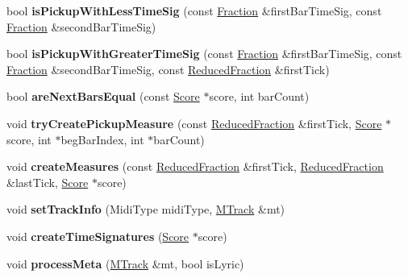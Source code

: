 \begin{DoxyCompactItemize}
\mbox{\label{namespace_ms_a4cdc7d39f903f2e1b78e5e2279b4a17a}} 
bool {\bfseries is\+Pickup\+With\+Less\+Time\+Sig} (const \hyperlink{class_ms_1_1_fraction}{Fraction} \&first\+Bar\+Time\+Sig, const \hyperlink{class_ms_1_1_fraction}{Fraction} \&second\+Bar\+Time\+Sig)
\item 
\mbox{\label{namespace_ms_ae5170436b6e52f3aafe94ecda1273c24}} 
bool {\bfseries is\+Pickup\+With\+Greater\+Time\+Sig} (const \hyperlink{class_ms_1_1_fraction}{Fraction} \&first\+Bar\+Time\+Sig, const \hyperlink{class_ms_1_1_fraction}{Fraction} \&second\+Bar\+Time\+Sig, const \hyperlink{class_ms_1_1_reduced_fraction}{Reduced\+Fraction} \&first\+Tick)
\item 
\mbox{\label{namespace_ms_aaa38d7121f13e9a80b429fa8842f84f0}} 
bool {\bfseries are\+Next\+Bars\+Equal} (const \hyperlink{class_ms_1_1_score}{Score} $\ast$score, int bar\+Count)
\item 
\mbox{\label{namespace_ms_aa9bb3f5b2394200758634d2891869dd4}} 
void {\bfseries try\+Create\+Pickup\+Measure} (const \hyperlink{class_ms_1_1_reduced_fraction}{Reduced\+Fraction} \&first\+Tick, \hyperlink{class_ms_1_1_score}{Score} $\ast$score, int $\ast$beg\+Bar\+Index, int $\ast$bar\+Count)
\item 
\mbox{\label{namespace_ms_aa0f5a229be3b7c1909dd746a67a5b386}} 
void {\bfseries create\+Measures} (const \hyperlink{class_ms_1_1_reduced_fraction}{Reduced\+Fraction} \&first\+Tick, \hyperlink{class_ms_1_1_reduced_fraction}{Reduced\+Fraction} \&last\+Tick, \hyperlink{class_ms_1_1_score}{Score} $\ast$score)
\item 
\mbox{\label{namespace_ms_a44b4ddf1c253c70973b116b9397854d4}} 
void {\bfseries set\+Track\+Info} (Midi\+Type midi\+Type, \hyperlink{class_ms_1_1_m_track}{M\+Track} \&mt)
\item 
\mbox{\label{namespace_ms_a46acb7691292d06ec7dc2501797a413e}} 
void {\bfseries create\+Time\+Signatures} (\hyperlink{class_ms_1_1_score}{Score} $\ast$score)
\item 
\mbox{\label{namespace_ms_acc6d07afd552cb490a5517393811b5be}} 
void {\bfseries process\+Meta} (\hyperlink{class_ms_1_1_m_track}{M\+Track} \&mt, bool is\+Lyric)

\end{DoxyCompactItemize}
